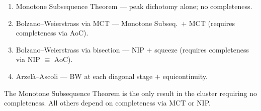 \begin{remark}
\begin{enumerate}
  \item Monotone Subsequence Theorem --- peak dichotomy alone; no completeness.
  \item Bolzano--Weierstrass via MCT --- Monotone Subseq.\ $+$ MCT (requires
        completeness via AoC).
  \item Bolzano--Weierstrass via bisection --- NIP $+$ squeeze (requires
        completeness via NIP $\equiv$ AoC).
  \item Arzel\`a--Ascoli --- BW at each diagonal stage $+$ equicontinuity.
\end{enumerate}
The Monotone Subsequence Theorem is the only result in the cluster requiring
no completeness. All others depend on completeness via MCT or NIP.
\end{remark}
